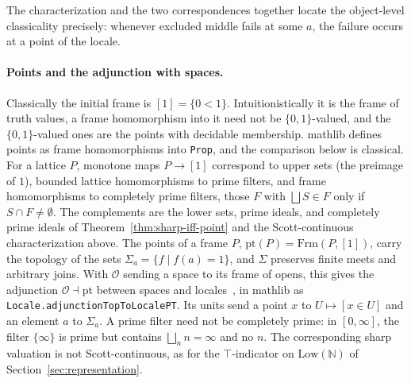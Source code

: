 \noindent  The characterization and the two
correspondences together locate the object-level classicality
precisely: whenever
excluded middle fails at some $a$, the failure occurs at a
point of the locale.

\paragraph{Points and the adjunction with spaces.}
Classically the initial frame is $[1] = \{0 < 1\}$. Intuitionistically it
is the frame of truth values, a frame homomorphism into it need not be
$\{0,1\}$-valued, and the $\{0,1\}$-valued ones are the points with
decidable membership. \textsf{mathlib} defines points as frame
homomorphisms into \texttt{Prop}, and the comparison below is classical.
For a lattice $P$, monotone maps
$P \to [1]$ correspond to upper sets (the preimage of $1$), bounded
lattice homomorphisms to prime filters, and frame homomorphisms to
completely prime filters, those $F$ with $\bigsqcup S \in F$ only if
$S \cap F \neq \emptyset$. The complements are the lower sets, prime
ideals, and completely prime ideals of Theorem~\ref{thm:sharp-iff-point}
and the Scott-continuous characterization above. The points of a frame $P$, $\mathrm{pt}(P) =
\mathrm{Frm}(P, [1])$, carry the topology of the sets $\Sigma_a =
\{f \mid f(a) = 1\}$, and $\Sigma$ preserves finite meets and arbitrary
joins. With $\mathcal{O}$ sending a space to its frame of opens, this gives
the adjunction $\mathcal{O} \dashv \mathrm{pt}$ between spaces and
locales~\cite{johnstone1982}, in \textsf{mathlib} as
\texttt{Locale.adjunctionTopToLocalePT}. Its units send a point $x$ to
$U \mapsto [x \in U]$ and an element $a$ to $\Sigma_a$. A prime filter
need not be completely prime: in $[0,\infty]$, the filter $\{\infty\}$ is
prime but contains $\bigsqcup_n n = \infty$ and no $n$. The
corresponding sharp valuation is not Scott-continuous, as for the
$\top$-indicator on $\mathrm{Low}(\mathbb{N})$ of
Section~\ref{sec:representation}.

